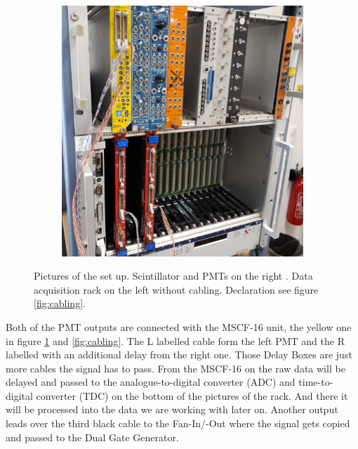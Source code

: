 \documentclass[]{article}
\begin{document}
\begin{figure}[H]
\begin{subfigure}[h]{0.4\textwidth}
\end{subfigure}
\begin{subfigure}[h]{0.59\textwidth}
\includegraphics[width=1\textwidth]{Plots/Raw.jpg}
\end{subfigure}
\caption{Pictures of the set up. Scintillator and PMTs on the right \cite{script}. Data acquisition rack on the left without cabling. Declaration see figure \ref{fig:cabling}.}
\label{fig:setup}
\end{figure}

Both of the PMT outputs are connected with the MSCF-16 unit, the yellow one in figure \ref{fig:setup} and \ref{fig:cabling}. The L labelled cable form the left PMT and the R labelled with an additional delay from the right one. Those Delay Boxes are just more cables the signal has to pass. From the MSCF-16 on the raw data will be delayed and passed to the analogue-to-digital converter (ADC) and time-to-digital converter (TDC) on the bottom of the pictures of the rack. And there it will be processed into the data we are working with later on. Another output leads over the third black cable to the Fan-In/-Out where the signal gets copied and passed to the Dual Gate Generator.

\end{document}
